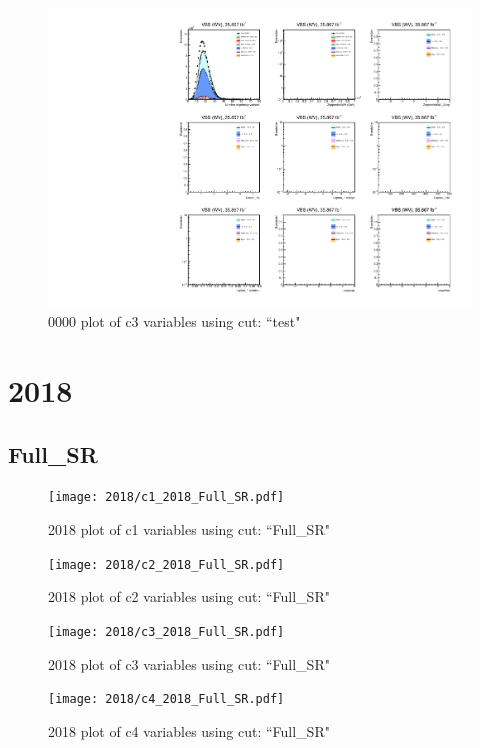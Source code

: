 \documentclass{article}
\begin{document}
                        \begin{figure}[H]
                            \centering
                            \caption{0000 plot of c3 variables using cut: ``test"}
                            \includegraphics[width=\textwidth]{0000/c3_0000_test.pdf}
                        \end{figure}    
    \section*{2018}
      \subsection*{Full\_SR}
                        \begin{figure}[H]
                            \centering
                            \caption{2018 plot of c1 variables using cut: ``Full\_SR"}
                            \texttt{[image: 2018/c1\_2018\_Full\_SR.pdf]}
                        \end{figure}    
                        \begin{figure}[H]
                            \centering
                            \caption{2018 plot of c2 variables using cut: ``Full\_SR"}
                            \texttt{[image: 2018/c2\_2018\_Full\_SR.pdf]}
                        \end{figure}    
                        \begin{figure}[H]
                            \centering
                            \caption{2018 plot of c3 variables using cut: ``Full\_SR"}
                            \texttt{[image: 2018/c3\_2018\_Full\_SR.pdf]}
                        \end{figure}    
                        \begin{figure}[H]
                            \centering
                            \caption{2018 plot of c4 variables using cut: ``Full\_SR"}
                            \texttt{[image: 2018/c4\_2018\_Full\_SR.pdf]}
                        \end{figure}    
\end{document}
